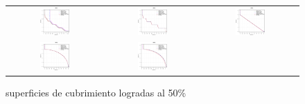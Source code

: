 \begin{figure}[H]
\caption{superficies de cubrimiento logradas al 50\%}%
\begin{tabular}{ccc}
  \includegraphics[width=0.33\textwidth]{Figures_Chapter7/Results_Chapter4/Surface_eps/WFG1.eps}  &
  \includegraphics[width=0.33\textwidth]{Figures_Chapter7/Results_Chapter4/Surface_eps/WFG2.eps} &
  \includegraphics[width=0.33\textwidth]{Figures_Chapter7/Results_Chapter4/Surface_eps/WFG3.eps} \\
  \includegraphics[width=0.33\textwidth]{Figures_Chapter7/Results_Chapter4/Surface_eps/WFG4.eps} &
  \includegraphics[width=0.33\textwidth]{Figures_Chapter7/Results_Chapter4/Surface_eps/WFG5.eps} &

\end{tabular}
\end{figure}
